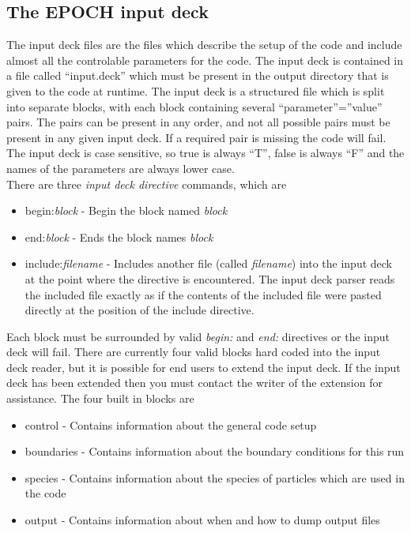 \documentclass[12pt]{article}
\begin{document}
\subsection{The EPOCH input deck}
The input deck files are the files which describe the setup of the code and include almost all the controlable parameters for the code. The input deck is contained in a file called ``input.deck'' which must be present in the output directory that is given to the code at runtime. The input deck is a structured file which is split into separate blocks, with each block containing several ``parameter''=''value'' pairs. The pairs can be present in any order, and not all possible pairs must be present in any given input deck. If a required pair is missing the code will fail. The input deck is case sensitive, so true is always ``T'', false is always ``F'' and the names of the parameters are always lower case.\\

There are three {\it input deck directive} commands, which are
\begin{itemize}
\item begin:{\it block} - Begin the block named {\it block}
\item end:{\it block} - Ends the block names {\it block}
\item include:{\it filename} - Includes another file (called {\it filename}) into the input deck at the point where the directive is encountered. The input deck parser reads the included file exactly as if the contents of the included file were pasted directly at the position of the include directive.
\end{itemize}
Each block must be surrounded by valid {\it begin:} and {\it end:} directives or the input deck will fail. There are currently four valid blocks hard coded into the input deck reader, but it is possible for end users to extend the input deck. If the input deck has been extended then you must contact the writer of the extension for assistance. The four built in blocks are
\begin{itemize}
\item control - Contains information about the general code setup
\item boundaries - Contains information about the boundary conditions for this run
\item species - Contains information about the species of particles which are used in the code
\item output - Contains information about when and how to dump output files
\end{itemize}
\end{document}

